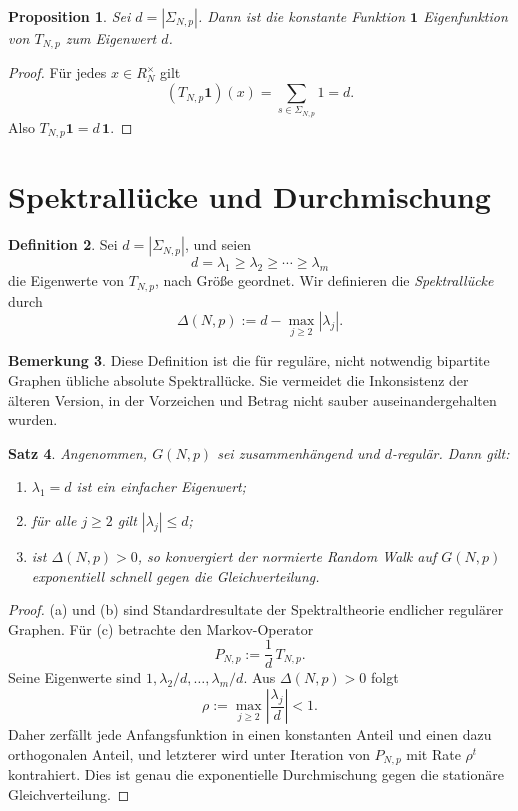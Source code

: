 \documentclass[12pt,a4paper]{article}
\newtheorem{theorem}{Satz}[section]
\newtheorem{proposition}[theorem]{Proposition}
\theoremstyle{definition}
\newtheorem{definition}[theorem]{Definition}
\newtheorem{remark}[theorem]{Bemerkung}
\begin{document}
	\begin{proposition}
		Sei \(d=|\Sigma_{N,p}|\). Dann ist die konstante Funktion \(\mathbf{1}\) Eigenfunktion von \(T_{N,p}\) zum Eigenwert \(d\).
	\end{proposition}
	
	\begin{proof}
		Für jedes \(x\in R_N^\times\) gilt
		\[
		(T_{N,p}\mathbf{1})(x)
		=
		\sum_{s\in\Sigma_{N,p}} 1
		=
		d.
		\]
		Also \(T_{N,p}\mathbf{1}=d\,\mathbf{1}\).
	\end{proof}
	
	\section{Spektrallücke und Durchmischung}
	
	\begin{definition}
		Sei \(d=|\Sigma_{N,p}|\), und seien
		\[
		d=\lambda_1\ge \lambda_2\ge \cdots \ge \lambda_m
		\]
		die Eigenwerte von \(T_{N,p}\), nach Größe geordnet. Wir definieren die \emph{Spektrallücke} durch
		\[
		\Delta(N,p):=d-\max_{j\ge 2}|\lambda_j|.
		\]
	\end{definition}
	
	\begin{remark}
		Diese Definition ist die für reguläre, nicht notwendig bipartite Graphen übliche absolute Spektrallücke. Sie vermeidet die Inkonsistenz der älteren Version, in der Vorzeichen und Betrag nicht sauber auseinandergehalten wurden.
	\end{remark}
	
	\begin{theorem}
		Angenommen, \(G(N,p)\) sei zusammenhängend und \(d\)-regulär. Dann gilt:
		\begin{enumerate}[label=(\alph*)]
			\item \(\lambda_1=d\) ist ein einfacher Eigenwert;
			\item für alle \(j\ge 2\) gilt \(|\lambda_j|\le d\);
			\item ist \(\Delta(N,p)>0\), so konvergiert der normierte Random Walk auf \(G(N,p)\) exponentiell schnell gegen die Gleichverteilung.
		\end{enumerate}
	\end{theorem}
	
	\begin{proof}
		(a) und (b) sind Standardresultate der Spektraltheorie endlicher regulärer Graphen.  
		Für (c) betrachte den Markov-Operator
		\[
		P_{N,p}:=\frac1d\,T_{N,p}.
		\]
		Seine Eigenwerte sind \(1,\lambda_2/d,\dots,\lambda_m/d\). Aus \(\Delta(N,p)>0\) folgt
		\[
		\rho:=\max_{j\ge 2}\left|\frac{\lambda_j}{d}\right|<1.
		\]
		Daher zerfällt jede Anfangsfunktion in einen konstanten Anteil und einen dazu orthogonalen Anteil, und letzterer wird unter Iteration von \(P_{N,p}\) mit Rate \(\rho^t\) kontrahiert. Dies ist genau die exponentielle Durchmischung gegen die stationäre Gleichverteilung.
	\end{proof}
	
\end{document}
